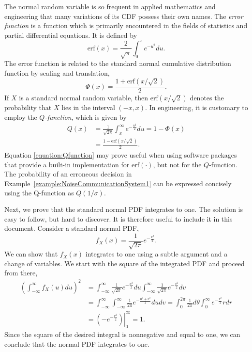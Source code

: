 The normal random variable is so frequent in applied mathematics and engineering that many variations of its CDF possess their own names.
The \emph{error function} is a function which is primarily encountered in the fields of statistics and partial differential equations. 
It is defined by
\begin{equation*}
\mathrm{erf} (x) = \frac{2}{\sqrt{\pi}} \int_0^x e^{-u^2} du .
\end{equation*}
The error function is related to the standard normal cumulative distribution function by scaling and translation,
\begin{equation*}
\Phi (x) = \frac{1 + \mathrm{erf} \left( {x}/{\sqrt{2}} \right)}{2}.
\end{equation*}
If $X$ is a standard normal random variable, then $\mathrm{erf} \left( x/{\sqrt{2}} \right)$ denotes the probability that $X$ lies in the interval $(-x, x)$.
In engineering, it is customary to employ the \emph{$Q$-function}, which is given by 
\begin{equation} \label{equation:Qfunction}
\begin{split}
Q (x) &= \frac{1}{\sqrt{2 \pi}} \int_x^{\infty} e^{-\frac{u^2}{2}} du
= 1 - \Phi (x) \\
&= \frac{ 1 - \mathrm{erf} \left( {x}/{\sqrt{2}} \right) }{2} .
\end{split}
\end{equation}
Equation \eqref{equation:Qfunction} may prove useful when using software packages that provide a built-in implementation for $\mathrm{erf}(\cdot)$, but not for the $Q$-function.
The probability of an erroneous decision in Example~\ref{example:NoiseCommunicationSystem1} can be expressed concisely using the Q-function as $Q (1/\sigma)$.


Next, we prove that the standard normal PDF integrates to one.
The solution is easy to follow, but hard to discover.
It is therefore useful to include it in this document.
Consider a standard normal PDF,
\begin{equation*}
f_X(x) = \frac{1}{\sqrt{2 \pi}} e^{- \frac{x^2}{2}} .
\end{equation*}
We can show that $f_X (x)$ integrates to one using a subtle argument and a change of variables.
We start with the square of the integrated PDF and proceed from there,
\begin{equation*}
\begin{split}
\left(\int_{- \infty}^{\infty} f_X (u) du \right)^2
&= \int_{- \infty}^{\infty} \frac{1}{\sqrt{2 \pi}} e^{- \frac{u^2}{2}} du
\int_{- \infty}^{\infty} \frac{1}{\sqrt{2 \pi}} e^{- \frac{v^2}{2}} dv \\
&= \int_{- \infty}^{\infty} \int_{- \infty}^{\infty}
\frac{1}{2 \pi} e^{- \frac{u^2 + v^2}{2}} du dv
= \int_{0}^{2 \pi} \frac{1}{2 \pi} d\theta
\int_{0}^{\infty} e^{- \frac{r^2}{2}} r dr \\
&= \left. \left( - e^{- \frac{r^2}{2}} \right) \right|_0^{\infty} = 1.
\end{split}
\end{equation*}
Since the square of the desired integral is nonnegative and equal to one, we can conclude that the normal PDF integrates to one.

